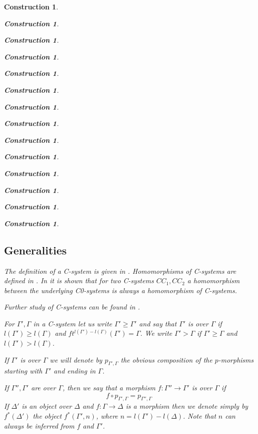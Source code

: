\documentclass[12pt]{amsart}
\newtheorem{construction}[proposition]{Construction}
\newcommand{\llabel}[1]{\label{#1}}
\newcommand{\sr}{\rightarrow}
\begin{document}
\begin{construction}
\begin{construction}
\begin{construction}
\begin{construction}
\begin{construction}
\begin{construction}
\begin{construction}
\begin{construction}
\begin{construction}
\begin{construction}
\begin{construction}
\begin{construction}
\begin{construction}
\begin{construction}
\subsection{Generalities}
\llabel{onCsystems}
%
The definition of a C-system is given in \cite[Def. 2.1,
  2.3]{Csubsystems}. Homomorphisms of C-systems are defined in \cite[Def. 3.1,
  p 1188]{Cfromauniverse}. In \cite[Lemma 3.4, p.~1190]{Cfromauniverse} it is
shown that for two C-systems $CC_1, CC_2$ a homomorphism between the underlying
C0-systems is always a homomorphism of C-systems.

Further study of C-systems can be found in \cite[Sec. 2, pp. 1048-1064]{fromunivwithPiI}. 

For $\Gamma',\Gamma$ in a C-system let us write $\Gamma'\ge \Gamma'$ and say
that $\Gamma'$ is over $\Gamma$ if $l(\Gamma')\ge l(\Gamma)$ and
$ft^{l(\Gamma')-l(\Gamma)}(\Gamma')=\Gamma$. We write $\Gamma'>\Gamma$ if
$\Gamma'\ge \Gamma$ and $l(\Gamma')>l(\Gamma)$.

If $\Gamma'$ is over $\Gamma$ we will denote by $p_{\Gamma',\Gamma}$ the
obvious composition of the $p$-morphisms starting with $\Gamma'$ and ending in
$\Gamma$.

If $\Gamma'',\Gamma'$ are over $\Gamma$, then we say that a morphism
$f:\Gamma''\sr \Gamma'$ is over $\Gamma$ if
%
$$f\circ p_{\Gamma',\Gamma}=p_{\Gamma'',\Gamma}$$
%
If $\Delta'$ is an object over $\Delta$ and $f:\Gamma\sr \Delta$ is a morphism
then we denote simply by $f^*(\Delta')$ the object $f^*(\Gamma',n)$, where
$n=l(\Gamma')-l(\Delta)$. Note that $n$ can always be inferred from $f$ and
$\Gamma'$.


\end{construction}
\end{construction}
\end{construction}
\end{construction}
\end{construction}
\end{construction}
\end{construction}
\end{construction}
\end{construction}
\end{construction}
\end{construction}
\end{construction}
\end{construction}
\end{construction}
\end{document}
